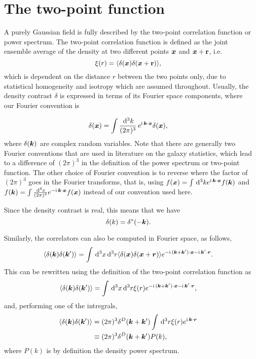 \section{The two-point function}

A purely Gaussian field is fully described by the two-point correlation function or power spectrum. The two-point correlation function is defined as the joint ensemble average of the density at two different points $\bm {x}$ and $\bm {x} + \textbf{r}$, i.e. 
\begin{equation}
	\xi(r) = \langle \delta(\bm {x}) \delta(\bm {x} + \textbf{r}) \rangle,
\end{equation}
which is dependent on the distance $r$ between the two points only, due to statistical homogeneity and isotropy which are assumed throughout. Usually, the density contrast $\delta$ is expressed in terms of its Fourier space components, where our Fourier convention is 

\begin{equation}
	\delta({\bm {x}}) = \int \frac{\,\mathrm{d}^3k}{(2\pi)^3} \, e^{\mathrm{i\,} \bm {k} \cdot \bm {x} } \delta(\bm {x}),
\end{equation}
where $\delta(\bm {k})$ are complex random variables. Note that there are generally two Fourier conventions that are used in literature on the galaxy statistics, which lead to a difference of $(2\pi)^3$ in the definition of the power spectrum or two-point function. The other choice of Fourier convention is to reverse where the factor of $(2\pi)^3$ goes in the Fourier transforms, that is, using $f(\bm {x}) = \int \,\mathrm{d}^3k e^{\mathrm{i\,} \bm {k} \cdot \bm {x}} f(\bm {k}) $ and $f(\bm {k}) = \int \frac{\,\mathrm{d}^3 x}{(2\pi)^3} e^{-\mathrm{i\,} \bm {k} \cdot \bm {x}} f(\bm {x})$ instead of our convention used here.

Since the density contrast is real, this means that we have
\begin{equation}
	\delta(k) = \delta^*(-\bm {k}).
\end{equation}

Similarly, the correlators can also be computed in Fourier space, as follows, 
\begin{equation}
	\langle \delta(\bm {k}) \delta(\bm {k}') \rangle = \int \,\mathrm{d}^3 x \,\mathrm{d}^3 r \langle \delta(\bm {x}) \delta(\bm {x} + \bm{r})\rangle e^{-\mathrm{i\,} (\bm {k} + \bm {k}') \cdot \bm {x} - \mathrm{i\,} \bm {k}' \cdot \bm{r}}.
\end{equation}
This can be rewritten using the definition of the two-point correlation function as 
\begin{equation}
	\langle \delta(\bm {k}) \delta(\bm {k}') \rangle = \int \,\mathrm{d}^3 x \,\mathrm{d}^3 r \xi(r) e^{-\mathrm{i\,} (\bm {k} + \bm {k}') \cdot \bm {x} - \mathrm{i\,} \bm {k}' \cdot \bm{r}},
\end{equation}
and, performing one of the intregrals, 
\begin{align}
	\langle \delta(\bm {k}) \delta(\bm {k}') \rangle &= (2\pi)^3 \delta^D(\bm {k} + \bm {k}') \int \,\mathrm{d}^3 r \xi(r) e^{\mathrm{i\,} \bm {k} \cdot \bm{r}} \\
	&\equiv (2\pi)^3 \delta^D(\bm {k} + \bm {k}') P(k),
\end{align}
where $P(k)$ is by definition the density power spectrum.

